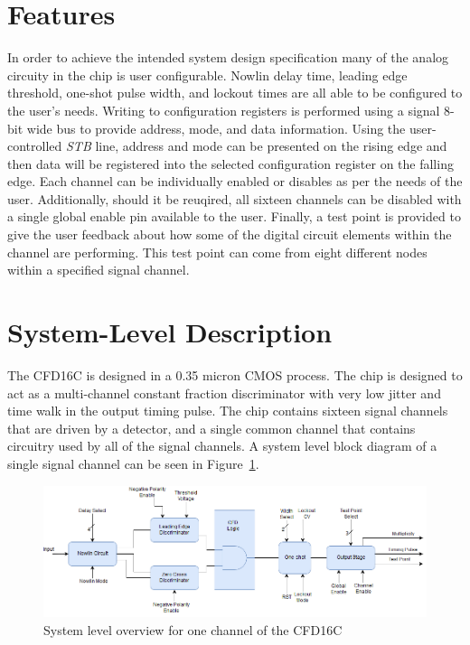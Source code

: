 \documentclass[12pt,oneside,final]{siuethesis}
\theoremstyle{definition}
\begin{document}
\section{Features}
\par In order to achieve the intended system design specification many of the analog circuity in the chip is user configurable. Nowlin delay time, leading edge threshold, one-shot pulse width, and lockout times are all able to be configured to the user's needs. Writing to configuration registers is performed using a signal 8-bit wide bus to provide address, mode, and data information. Using the user-controlled \emph{STB} line, address and mode can be presented on the rising edge and then data will be registered into the selected configuration register on the falling edge. Each channel can be individually enabled or disables as per the needs of the user. Additionally, should it be reuqired, all sixteen channels can be disabled with a single global enable pin available to the user. Finally, a test point is provided to give the user feedback about how some of the digital circuit elements within the channel are performing. This test point can come from eight different nodes within a specified signal channel.

\section{System-Level Description}
\par The CFD16C is designed in a 0.35 micron CMOS process. The chip is designed to act as a multi-channel constant fraction discriminator with very low jitter and time walk in the output timing pulse. The chip contains sixteen signal channels that are driven by a detector, and a single common channel that contains circuitry used by all of the signal channels. A system level block diagram of a single signal channel can be seen in Figure~\ref{fig:CFD}.

\begin{figure}[ht]
\centering
\includegraphics[scale=.47,keepaspectratio=true]{./ch2_figures/channel_block.png} 
\caption{System level overview for one channel of the CFD16C}
\label{fig:CFD}
\end{figure}
\end{document}
